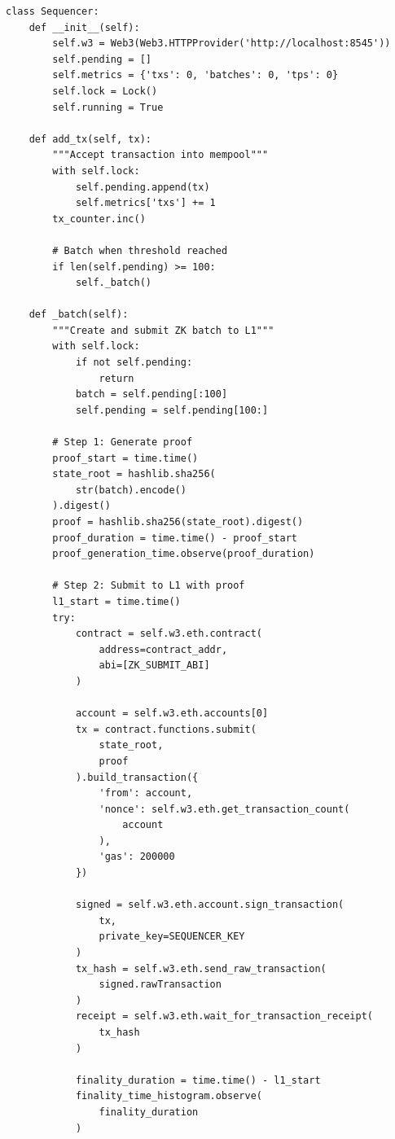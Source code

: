 \begin{listing}[H]
    \begin{verbatim}
class Sequencer:
    def __init__(self):
        self.w3 = Web3(Web3.HTTPProvider('http://localhost:8545'))
        self.pending = []
        self.metrics = {'txs': 0, 'batches': 0, 'tps': 0}
        self.lock = Lock()
        self.running = True
        
    def add_tx(self, tx):
        """Accept transaction into mempool"""
        with self.lock:
            self.pending.append(tx)
            self.metrics['txs'] += 1
        tx_counter.inc()
        
        # Batch when threshold reached
        if len(self.pending) >= 100:
            self._batch()
    
    def _batch(self):
        """Create and submit ZK batch to L1"""
        with self.lock:
            if not self.pending:
                return
            batch = self.pending[:100]
            self.pending = self.pending[100:]
        
        # Step 1: Generate proof
        proof_start = time.time()
        state_root = hashlib.sha256(
            str(batch).encode()
        ).digest()
        proof = hashlib.sha256(state_root).digest()
        proof_duration = time.time() - proof_start
        proof_generation_time.observe(proof_duration)
        
        # Step 2: Submit to L1 with proof
        l1_start = time.time()
        try:
            contract = self.w3.eth.contract(
                address=contract_addr,
                abi=[ZK_SUBMIT_ABI]
            )
            
            account = self.w3.eth.accounts[0]
            tx = contract.functions.submit(
                state_root, 
                proof
            ).build_transaction({
                'from': account,
                'nonce': self.w3.eth.get_transaction_count(
                    account
                ),
                'gas': 200000
            })
            
            signed = self.w3.eth.account.sign_transaction(
                tx, 
                private_key=SEQUENCER_KEY
            )
            tx_hash = self.w3.eth.send_raw_transaction(
                signed.rawTransaction
            )
            receipt = self.w3.eth.wait_for_transaction_receipt(
                tx_hash
            )
            
            finality_duration = time.time() - l1_start
            finality_time_histogram.observe(
                finality_duration
            )
            

\end{verbatim}
\end{listing}
